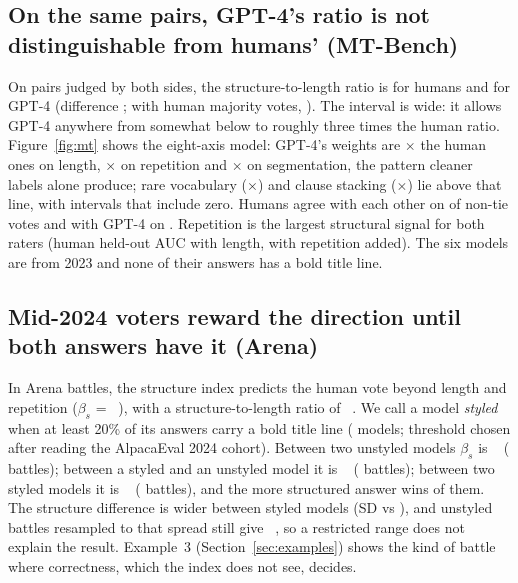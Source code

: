 \documentclass[11pt]{article}
\begin{document}
\subsection{On the same pairs, GPT-4's ratio is not distinguishable from humans' (MT-Bench)}\label{sec:mt}
On \mtPairs{} pairs judged by both sides, the structure-to-length ratio is \mtRH{} for humans and \mtRG{} for GPT-4 (difference \mtRDiffCI; with human majority votes, \mtMajDiffCI). The interval is wide: it allows GPT-4 anywhere from somewhat below to roughly three times the human ratio. Figure~\ref{fig:mt} shows the eight-axis model: GPT-4's weights are \mtScaleLen{}$\times$ the human ones on length, \mtScaleRep{}$\times$ on repetition and \mtScaleRv{}$\times$ on segmentation, the pattern cleaner labels alone produce; rare vocabulary (\mtScaleXp$\times$) and clause stacking (\mtScaleDs$\times$) lie above that line, with intervals that include zero. Humans agree with each other on \mtAgreeHH{} of non-tie votes and with GPT-4 on \mtAgreeHG. Repetition is the largest structural signal for both raters (human held-out AUC \mtAucHLen{} with length, \mtAucHRep{} with repetition added). The six models are from 2023 and none of their answers has a bold title line.

\subsection{Mid-2024 voters reward the direction until both answers have it (Arena)}\label{sec:arena}
In \arBattles{} Arena battles, the structure index predicts the human vote beyond length and repetition ($\beta_s$ = \arStruct{}~\arStructCI), with a structure-to-length ratio of \arRatio{}~\arRatioCI. We call a model \emph{styled} when at least 20\% of its answers carry a bold title line (\arStyleModels{} models; threshold chosen after reading the AlpacaEval 2024 cohort). Between two unstyled models $\beta_s$ is \arNeiStruct{}~\arNeiStructCI{} (\arNeiN{} battles); between a styled and an unstyled model it is \arMixStruct{}~\arMixStructCI{} (\arMixN{} battles); between two styled models it is \arBothStruct{}~\arBothStructCI{} (\arBothN{} battles), and the more structured answer wins \arBothHigherWins{} of them. The structure difference is wider between styled models (SD \arSdBoth{} vs \arSdNei), and unstyled battles resampled to that spread still give \arMatched{}~\arMatchedCI, so a restricted range does not explain the result. Example~3 (Section~\ref{sec:examples}) shows the kind of battle where correctness, which the index does not see, decides.
\end{document}
